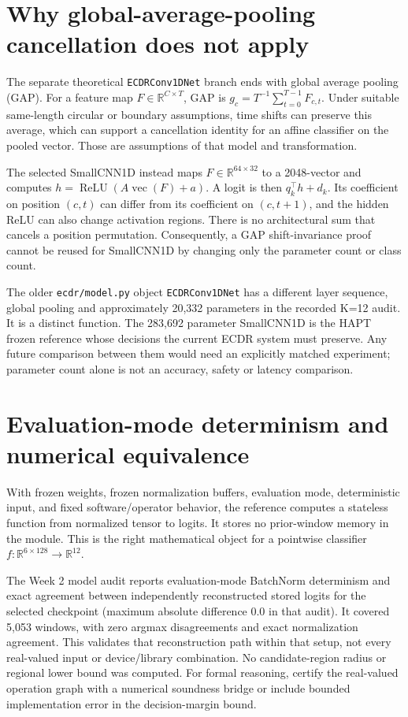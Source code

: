 \documentclass[11pt,a4paper]{article}
\newcommand{\R}{\mathbb R}\newcommand{\relu}{\operatorname{ReLU}}
\newcommand{\code}[1]{{\small\ttfamily\nolinkurl{#1}}}
\begin{document}
\section{Why global-average-pooling cancellation does not apply}
The separate theoretical \code{ECDRConv1DNet} branch ends with global average pooling (GAP). For a feature map $F\in\R^{C\times T}$, GAP is $g_c=T^{-1}\sum_{t=0}^{T-1}F_{c,t}$. Under suitable same-length circular or boundary assumptions, time shifts can preserve this average, which can support a cancellation identity for an affine classifier on the pooled vector. Those are assumptions of that model and transformation.

The selected SmallCNN1D instead maps $F\in\R^{64\times32}$ to a 2048-vector and computes $h=\relu(A\operatorname{vec}(F)+a)$. A logit is then $q_k^\top h+d_k$. Its coefficient on position $(c,t)$ can differ from its coefficient on $(c,t+1)$, and the hidden ReLU can also change activation regions. There is no architectural sum that cancels a position permutation. Consequently, a GAP shift-invariance proof cannot be reused for SmallCNN1D by changing only the parameter count or class count.

The older \code{ecdr/model.py} object \code{ECDRConv1DNet} has a different layer sequence, global pooling and approximately 20,332 parameters in the recorded K=12 audit. It is a distinct function. The 283,692 parameter SmallCNN1D is the HAPT frozen reference whose decisions the current ECDR system must preserve. Any future comparison between them would need an explicitly matched experiment; parameter count alone is not an accuracy, safety or latency comparison.

\section{Evaluation-mode determinism and numerical equivalence}
With frozen weights, frozen normalization buffers, evaluation mode, deterministic input, and fixed software/operator behavior, the reference computes a stateless function from normalized tensor to logits. It stores no prior-window memory in the module. This is the right mathematical object for a pointwise classifier $f:\R^{6\times128}\to\R^{12}$.

The Week 2 model audit reports evaluation-mode BatchNorm determinism and exact agreement between independently reconstructed stored logits for the selected checkpoint (maximum absolute difference 0.0 in that audit). It covered 5,053 windows, with zero argmax disagreements and exact normalization agreement. This validates that reconstruction path within that setup, not every real-valued input or device/library combination. No candidate-region radius or regional lower bound was computed. For formal reasoning, certify the real-valued operation graph with a numerical soundness bridge or include bounded implementation error in the decision-margin bound.
\end{document}
